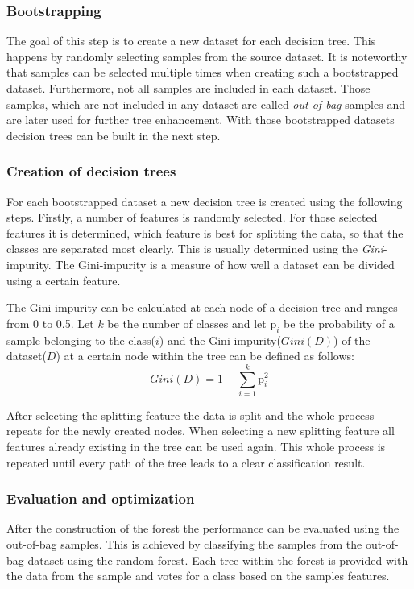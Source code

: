 \subsubsection*{Bootstrapping}
The goal of this step is to create a new dataset for each decision tree. This happens by randomly selecting 
samples from the source dataset. It is noteworthy that samples can be selected multiple times when creating such a bootstrapped dataset.
Furthermore, not all samples are included in each dataset. Those samples, which are not included in any dataset are called \textit{out-of-bag} samples 
and are later used for further tree enhancement. With those bootstrapped datasets decision trees can be built in the next step.

\subsubsection*{Creation of decision trees}
For each bootstrapped dataset a new decision tree is created using the following steps. Firstly, a number of features is randomly selected.
For those selected features it is determined, which feature is best for splitting the data, so that the classes are separated most clearly.
This is usually determined using the \textit{Gini}-impurity.
The Gini-impurity is a measure of how well a dataset can be divided using a certain feature.

The Gini-impurity can be calculated at each node of a decision-tree and ranges from 0 to 0.5.
Let $k$ be the number of classes and let $\mathrm{p}_{i}$ be the probability of a sample belonging to the class($i$) and the Gini-impurity($Gini(D)$) of the dataset($D$)
at a certain node within the tree can be defined as follows:
\begin{equation*}
    Gini(D) = 1 - \sum_{i=1}^{k} \mathrm{p}_{i}^2
\end{equation*} \cite[]{Karabiber}

After selecting the splitting feature the data is split and the whole process repeats for the newly created nodes.
When selecting a new splitting feature all features already existing in the tree can be used again. This whole process is 
repeated until every path of the tree leads to a clear classification result\cite[]{Breiman2001}.

\subsubsection*{Evaluation and optimization}
After the construction of the forest the performance can be evaluated using the out-of-bag samples.
This is achieved by classifying the samples from the out-of-bag dataset using the random-forest. Each tree within the forest is provided with the data from the sample
and votes for a class based on the samples features.

